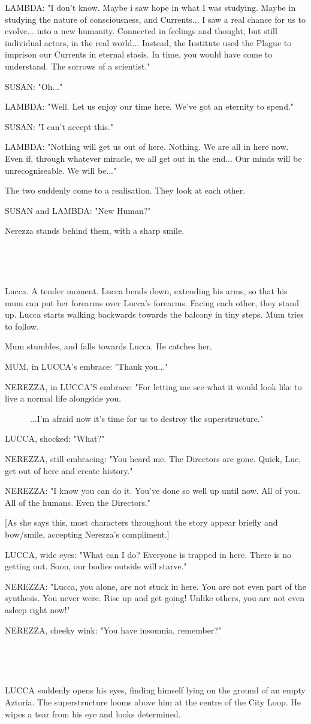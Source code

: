 \documentclass[11pt]{article}
\begin{document}
LAMBDA: "I don't know. 
Maybe i saw hope in what I was studying.
Maybe in studying the nature of consciousness, and Currents...
I saw a real chance for us to evolve...
into a new humanity.
Connected in feelings and thought, but still individual actors, in the real world...
Instead, the Institute used the Plague to imprison our Currents in eternal stasis.
In time, you would have come to understand.
The sorrows of a scientist."

SUSAN: "Oh..."

LAMBDA: "Well. 
Let us enjoy our time here. 
We've got an eternity to spend."

SUSAN: "I can't accept this."

LAMBDA: "Nothing will get us out of here. 
Nothing.
We are all in here now.
Even if, through whatever miracle, we all get out in the end...
Our minds will be unrecogniseable.
We will be..."

The two suddenly come to a realisation.
They look at each other.

SUSAN and LAMBDA: "New Human?"

Nerezza stands behind them, with a sharp smile.

\ 

\ 

Lucca.
A tender moment.
Lucca bends down, extending his arms, so that his mum can put her forearms over Lucca's forearms.
Facing each other, they stand up.
Lucca starts walking backwards towards the balcony in tiny steps.
Mum tries to follow.

Mum stumbles, and falls towards Lucca.
He catches her.

MUM, in LUCCA's embrace: "Thank you..."

NEREZZA, in LUCCA'S embrace: "For letting me see what it would look like to live a normal life alongside you.

\ \ \ \ \ \ ...I'm afraid now it's time for us to destroy the superstructure."

LUCCA, shocked: "What?"

NEREZZA, still embracing: "You heard me.
The Directors are gone.
Quick, Luc, get out of here and create history."

NEREZZA: "I know you can do it.
You've done so well up until now.
All of you.
All of the humans.
Even the Directors."

[As she says this, most characters throughout the story appear briefly and bow/smile, accepting Nerezza's compliment.]

LUCCA, wide eyes: "What can I do? 
Everyone is trapped in here. 
There is no getting out.
Soon, our bodies outside will starve."

NEREZZA: "Lucca, you alone, are not stuck in here. 
You are not even part of the synthesis.
You never were. 
Rise up and get going!
Unlike others, you are not even asleep right now!"

NEREZZA, cheeky wink: "You have insomnia, remember?"

\ 

\ 

LUCCA suddenly opens his eyes, finding himself lying on the ground of an empty Aztoria.
The superstructure looms above him at the centre of the City Loop.
He wipes a tear from his eye and looks determined.
\end{document}
